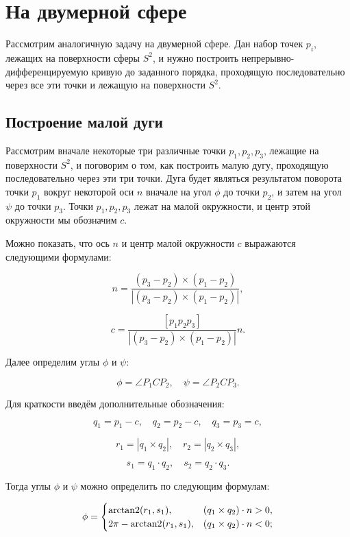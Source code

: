 \section{На двумерной сфере}

Рассмотрим аналогичную задачу на двумерной сфере. Дан набор точек ${p_i}$, лежащих на поверхности сферы $S^2$, и
нужно построить непрерывно-дифференцируемую кривую до заданного порядка, проходящую последовательно через все эти
точки и лежащую на поверхности $S^2$.

\subsection*{Построение малой дуги}

Рассмотрим вначале некоторые три различные точки $p_1, p_2, p_3$, лежащие на поверхности $S^2$, и поговорим о
том, как построить малую дугу, проходящую последовательно через эти три точки. Дуга будет являться результатом поворота
точки $p_1$ вокруг некоторой оси $n$ вначале на угол $\phi$ до точки $p_2$, и затем на угол $\psi$ до точки $p_3$.
Точки $p_1, p_2, p_3$ лежат на малой окружности, и центр этой окружности мы обозначим $c$.

Можно показать, что ось $n$ и центр малой окружности $c$ выражаются следующими формулами:

$$
n=\frac{(p_3-p_2)\times(p_1-p_2)}{|(p_3-p_2)\times(p_1-p_2)|},
$$

$$
c=\frac{[p_1p_2p_3]}{|(p_3-p_2)\times(p_1-p_2)|}n.
$$

Далее определим углы $\phi$ и $\psi$:

$$
\phi=\angle P_1CP_2, \quad \psi=\angle P_2CP_3.
$$

Для краткости введём дополнительные обозначения:

$$
q_1=p_1-c, \quad q_2=p_2-c, \quad q_3=p_3=c,
$$

$$
r_1=|q_1\times q_2|, \quad r_2=|q_2\times q_3|,
$$

$$
s_1=q_1\cdot q_2, \quad s_2=q_2\cdot q_3.
$$

Тогда углы $\phi$ и $\psi$ можно определить по следующим формулам:

\begin{equation*}
\phi=
 \begin{cases}
   \operatorname{arctan2}(r_1,s_1),      & (q_1\times q_2)\cdot n>0, \\
   2\pi-\operatorname{arctan2}(r_1,s_1), & (q_1\times q_2)\cdot n<0;
 \end{cases}
\end{equation*}

